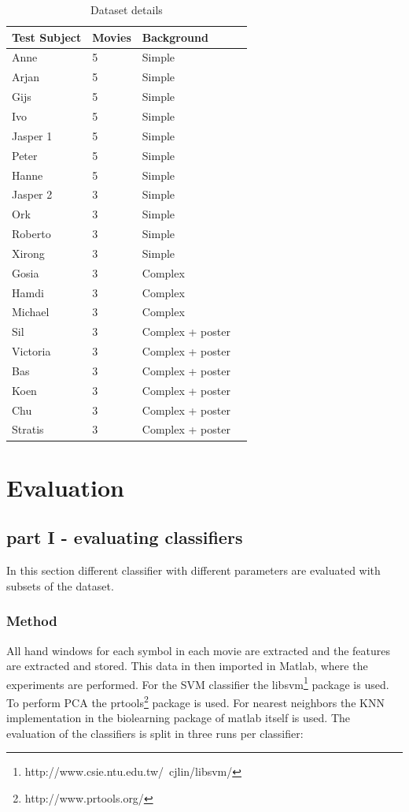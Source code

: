 \begin{table}
\centering
\begin{tabular}{llll}
\hline\hline
	Test Subject & Movies & Background &\\
\hline
	Anne     & 5 & Simple & \\
	Arjan    & 5 & Simple & \\
	Gijs     & 5 & Simple & \\
	Ivo      & 5 & Simple & \\
	Jasper 1 & 5 & Simple & \\
	Peter    & 5 & Simple & \\
	Hanne    & 5 & Simple & \\
	Jasper 2 & 3 & Simple & \\
	Ork      & 3 & Simple & \\
	Roberto  & 3 & Simple & \\
	Xirong   & 3 & Simple & \\
	Gosia    & 3 & Complex & \\
	Hamdi    & 3 & Complex & \\
	Michael  & 3 & Complex & \\
	Sil      & 3 & Complex + poster & \\
	Victoria & 3 & Complex + poster & \\
	Bas      & 3 & Complex + poster & \\
	Koen     & 3 & Complex + poster & \\
	Chu      & 3 & Complex + poster & \\
	Stratis  & 3 & Complex + poster & \\
\hline
\end{tabular}
\caption{Dataset details}
\end{table}

\section{Evaluation}

\subsection{part I - evaluating classifiers}
In this section different classifier with different parameters are evaluated with subsets of the dataset.

\subsubsection{Method}
All hand windows for each symbol in each movie are extracted and the features are extracted and stored. This data in then imported in Matlab, where the experiments are performed. For the SVM classifier the libsvm\footnote{http://www.csie.ntu.edu.tw/~cjlin/libsvm/} package is used. To perform PCA the prtools\footnote{http://www.prtools.org/} package is used. For nearest neighbors the KNN implementation in the biolearning package of matlab itself is used. The evaluation of the classifiers is split in three runs per classifier:

